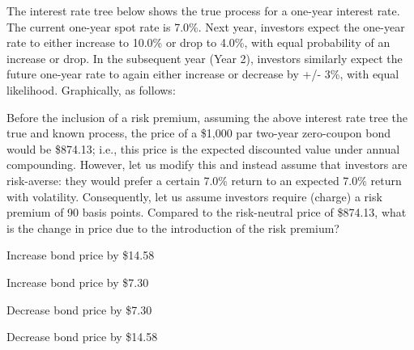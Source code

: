 \documentclass{article}
\newcounter{question} %
\begin{document}
\begin{question}
    The interest rate tree below shows the true process for a one-year interest rate. The
    current one-year spot rate is 7.0\%. Next year, investors expect the one-year rate to either
    increase to 10.0\% or drop to 4.0\%, with equal probability of an increase or drop. In the
    subsequent year (Year 2), investors similarly expect the future one-year rate to again either
    increase or decrease by +/- 3\%, with equal likelihood. Graphically, as follows:




    Before the inclusion of a risk premium, assuming the above interest rate tree the true and
    known process, the price of a \$1,000 par two-year zero-coupon bond would be \$874.13; i.e., this
    price is the expected discounted value under annual compounding. However, let us modify this
    and instead assume that investors are risk-averse: they would prefer a certain 7.0\% return to
    an expected 7.0\% return with volatility. Consequently, let us assume investors require (charge)
    a risk premium of 90 basis points. Compared to the risk-neutral price of \$874.13, what is the
    change in price due to the introduction of the risk premium?
    
\end{question}

\begin{choices}
    \item Increase bond price by \$14.58
    \item Increase bond price by \$7.30
    \item Decrease bond price by \$7.30
    \item Decrease bond price by \$14.58
\end{choices}
\end{document}
